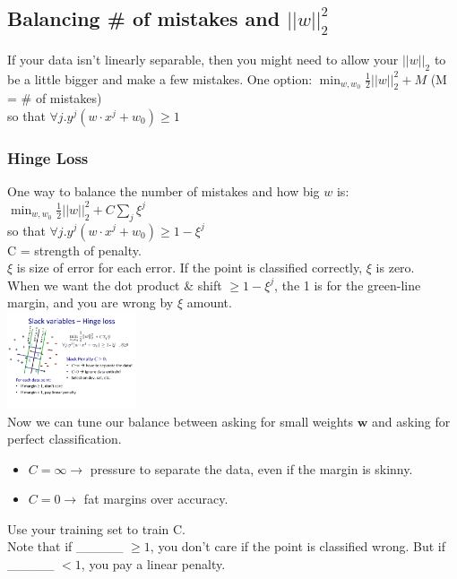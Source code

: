  \subsection{Balancing \# of mistakes and $||w||_2^2$}
 If your data isn't linearly separable, then you might need to allow your $||w||_2$ to be a little bigger and make a few mistakes. 
One option: 
 $\displaystyle  \min_{w, w_0} \frac{1}{2} ||w||_2^2 + M$ (M = \# of mistakes)  \hfill \\
 so that $\forall j . y^j(w \cdot x^j + w_0) \geq 1$
 
 \subsubsection{Hinge Loss}
 One way to balance the number of mistakes and how big $w$ is:  
  $\displaystyle  \min_{w, w_0} \frac{1}{2} ||w||_2^2 + C \sum_j \xi^j$ \hfill \\
 so that $\forall j . y^j(w \cdot x^j + w_0) \geq 1 - \xi^j$ \hfill \\
 C = strength of penalty. \hfill \\
 $\xi$ is size of error for each error.  If the point is classified correctly, $\xi$ is zero.   \hfill \\
 When we want the dot product \& shift $\geq 1 - \xi^j$, the 1 is for the green-line margin, and you are wrong by $\xi$  amount. \hfill \\
 \includegraphics[width=1.5in]{figures/hinge_loss_xis.pdf}
 \hfill \\
 Now we can tune our balance between asking for small weights $\bm{w}$ and asking for perfect classification. 
 \begin{itemize} 
 	\item $C  = \infty \rightarrow$ pressure to separate the data, even if the margin is skinny.
	\item $C = 0 \rightarrow$ fat margins over accuracy. 
\end{itemize}
Use your training set to train C.  \hfill \\ 
Note that if \_\_\_\_\_ $\geq 1$, you don't care if the point is classified wrong.   %
But if \_\_\_\_\_ $ < 1$, you pay a linear penalty. %
\hfill \\


